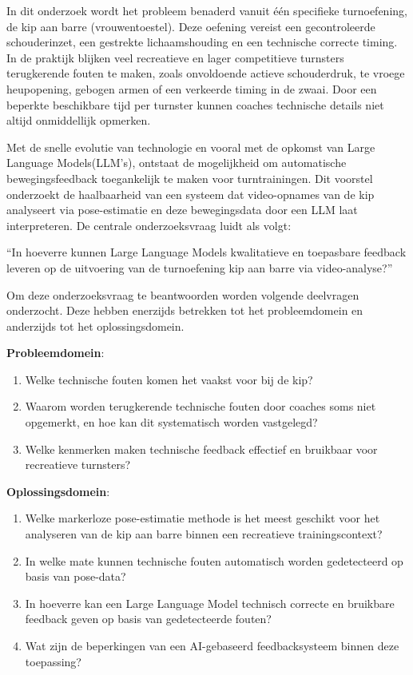 In dit onderzoek wordt het probleem benaderd vanuit één specifieke turnoefening, de kip aan barre (vrouwentoestel). Deze oefening vereist een gecontroleerde schouderinzet, een gestrekte lichaamshouding en een technische correcte timing. In de praktijk blijken veel recreatieve en lager competitieve turnsters terugkerende fouten te maken, zoals onvoldoende actieve schouderdruk, te vroege heupopening, gebogen armen of een verkeerde timing in de zwaai. Door een beperkte beschikbare tijd per turnster kunnen coaches technische details niet altijd onmiddellijk opmerken.

Met de snelle evolutie van technologie en voor\-al met de opkomst van Large Language Models\linebreak(LLM's), ontstaat de mogelijkheid om automatische bewegingsfeedback toegankelijk te maken voor turntrainingen. Dit voorstel onderzoekt de haalbaarheid van een systeem dat video-opnames van de kip analyseert via pose-estimatie en deze bewegingsdata door een LLM laat interpreteren. De centrale onderzoeksvraag luidt als volgt:\linebreak

 ``In hoeverre kunnen Large Language Models kwalitatieve en toepasbare feedback leveren op de uitvoering van de turnoefening kip aan barre via video-analyse?''\linebreak
 
 Om deze onderzoeksvraag te beantwoorden worden volgende deelvragen onderzocht. Deze hebben enerzijds betrekken tot het probleemdomein en anderzijds tot het oplossingsdomein.\linebreak
 
 \textbf{Probleemdomein}:
 
 \begin{enumerate}
     \item Welke technische fouten komen het vaakst voor bij de kip?
     \item Waarom worden terugkerende technische fouten door coaches soms niet opgemerkt, en hoe kan dit systematisch worden vastgelegd?
     \item Welke kenmerken maken technische feedback effectief en bruikbaar voor recreatieve turnsters?
 \end{enumerate}
 
 \textbf{Oplossingsdomein}:
 
\begin{enumerate}
    \item Welke markerloze pose-estimatie methode is het meest geschikt voor het analyseren van de kip aan barre binnen een recreatieve trainingscontext?
    \item In welke mate kunnen technische fouten automatisch worden gedetecteerd op basis van pose-data?
    \item In hoeverre kan een Large Language Model technisch correcte en bruikbare feedback geven op basis van gedetecteerde fouten?
    \item Wat zijn de beperkingen van een AI-gebaseerd feedbacksysteem binnen deze toepassing?
\end{enumerate}

